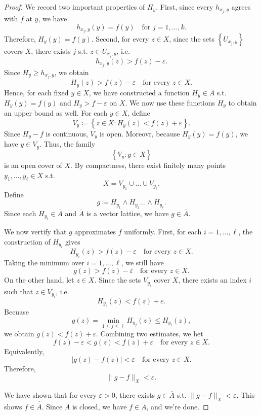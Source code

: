 \begin{proof}
    We record two important properties of \(H_y\). First, since every \(h_{x_j, y}\) agrees with \(f\) at \(y\), we have 
    \[
        h_{x_j, y}(y) = f(y) \quad \text{for } j = 1, \dots , k. 
    \]        
    Therefore, \(H_y(y) = f(y)\). Second, for every \(z \in X\), since the sets \(\left\{ U_{x_j, y} \right\} \) covers \(X\), there exists \(j\) s.t. \(z \in U_{x_j, y}\), i.e. 
    \[
        h_{x_j, y}(z) > f(z) - \varepsilon.
    \]     
    Since \(H_y \ge h_{x_j, y}\), we obtain 
    \[
        H_y(z) > f(z) - \varepsilon \quad \text{for every } z \in X. 
    \] 
    Hence, for each fixed \(y \in X\), we have constructed a function \(H_y \in \overline{A}\) s.t. \(H_y (y) = f(y)\) and \(H_y > f - \varepsilon\) on \(X\). We now use these functions \(H_y\) to obtain an upper bound as well. For each \(y \in X\), define 
    \[
        V_y \coloneqq \left\{ z \in X: H_y(z) < f(z) + \varepsilon \right\}. 
    \]       
    Since \(H_y - f\) is continuous, \(V_y\) is open. Moreovr, because \(H_y(y) = f(y)\), we have \(y \in V_y\). Thus, the family 
    \[
        \left\{ V_y: y \in X \right\} 
    \]    
    is an open cover of \(X\). By compactness, there exist finitely many points \(y_1, \dots , y_{\ell } \in X \) s.t. 
    \[
        X = V_{y_1} \cup \dots \cup V_{y_{\ell} }.
    \]  
    Define 
    \[
        g \coloneqq H_{y_1} \land H_{y_2} \dots \land H_{y_{\ell} }.
    \]
    Since each \(H_{y_i} \in \overline{A}\) and \(\overline{A}\) is a vector lattice, we have \(g \in \overline{A}\). 

    We now vertify that \(g\) approximates \(f\) uniformly. First, for each \(i = 1, \dots , \ell\), the construction of \(H_{y_i}\) gives 
    \[
        H_{y_i}(z) > f(z) - \varepsilon \quad \text{for every } z \in X. 
    \]      
    Taking the minimum over \(i = 1, \dots , \ell\), we still have 
    \[
        g(z) > f(z) - \varepsilon \quad \text{for every } z \in X. 
    \] 
    On the other hand, let \(z \in X\). Since the sets \(V_{y_i}\) cover \(X\), there exists an index \(i\) such that \(z \in V_{y_i}\), i.e. 
    \[
        H_{y_i}(z) < f(z) + \varepsilon.
    \]     
    Becuase 
    \[
        g(z) = \min _{1 \le j \le \ell} H_{y_j}(z) \le H_{y_i}(z),
    \]
    we obtain \(g(z) < f(z) + \varepsilon\). Combining two estimates, we het 
    \[
        f(z) - \varepsilon < g(z) < f(z) + \varepsilon \quad \text{for every } z \in X. 
    \] 
    Equivalently, 
    \[
        \vert g(z) - f(z) \vert < \varepsilon \quad \text{for every } z \in X.  
    \]
    Therefore,
    \[
        \lVert g - f \rVert_X < \varepsilon. 
    \]

    We have shown that for every \(\varepsilon > 0\), there exists \(g \in \overline{A}\) s.t. \(\lVert g - f \rVert_X < \varepsilon \). This shows \(f \in \overline{\overline{A}} \). Since \(\overline{A}\) is closed, we have \(f \in \overline{A}\), and we're done.     
\end{proof}

